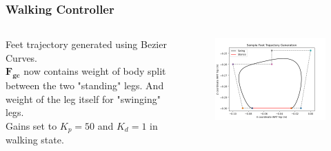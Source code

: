 \documentclass{beamer}
\begin{document}
\begin{frame}
    \frametitle{Walking Controller}
    \begin{columns}[onlytextwidth, T]
        \begin{column}{.4\textwidth}
            Feet trajectory generated using Bezier Curves. \\

            $\bm{F_{gc}}$ now contains weight of body split between the two "standing" legs.
            And weight of the leg itself for "swinging" legs. \\
            
            Gains set to $K_p = 50$ and $K_d = 1 $ in walking state.
        \end{column}
        \begin{column}{.6\textwidth}
            \begin{figure}
                \includegraphics[height=0.6\textheight]{../images/traj.png}
            \end{figure}

        
        \end{column}
      \end{columns}
\end{frame}
\end{document}
